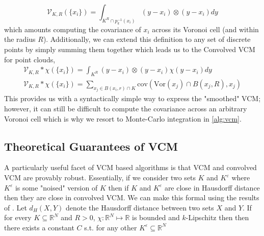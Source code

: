 \documentclass{article}
\begin{document}
\begin{equation}
    \mathcal{V}_{K,R}(\{x_i\}) = \int_{K^R \cap p_k^{-1}(x_i)}(y - x_i) \otimes (y - x_i) dy 
\end{equation}
which amounts computing the covariance of $x_i$ across its Voronoi cell (and within the radius $R$). Additionally, we can extend this definition to any set of discrete points by simply summing them together which leads us to the Convolved VCM for point clouds, 
\begin{equation}
    \begin{gathered}
            \mathcal{V}_{K,R}*\chi (\{x_i\}) = \int_{K^R}(y - x_i) \otimes (y - x_i) \chi(y - x_i) dy \\
            \mathcal{V}_{K,R}*\chi (\{x_i\}) = \sum_{x_j \in B(x_i,r) \cap K} \text{cov}(\text{Vor}(x_j) \cap B(x_j,R), x_j)
    \end{gathered}
\end{equation}
This provides us with a syntactically simple way to express the "smoothed" VCM; however, it can still be difficult to compute the covariance across an arbitrary Voronoi cell which is why we resort to Monte-Carlo integration in \eqref{alg:vcm}.   

\subsection{Theoretical Guarantees of VCM}
A particularly useful facet of VCM based algorithms is that VCM and convolved VCM are provably robust. Essentially, if we consider two sets $K$ and $K^\varepsilon$ where $K^\varepsilon$ is some "noised" version of $K$ then if $K$ and $K^\varepsilon$ are close in Hausdorff distance then they are close in convolved VCM. We can make this formal using the results of \cite{merigotVORONOI2011}. Let $d_H(X,Y)$ denote the Hausdorff distance between two sets $X$ and $Y$. If for every $K \subseteq \mathbb{R}^N$ and $R >0$, $\chi : \mathbb{R}^N \mapsto \mathbb{R}$ is bounded and $k$-Lipschitz then then there exists a constant $C$ s.t. for any other $K^\varepsilon \subseteq \mathbb{R}^N$ 
\end{document}
